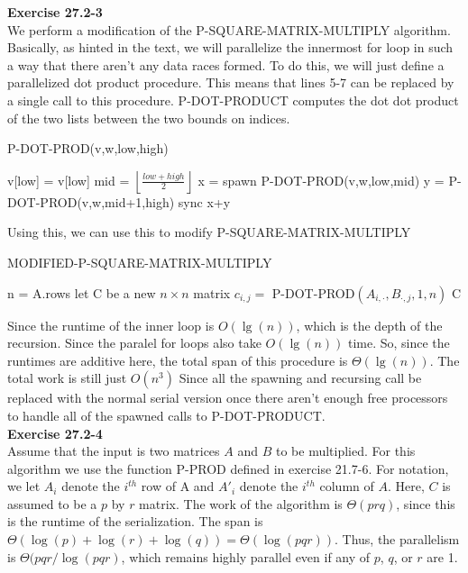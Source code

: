 \documentclass{article}
\begin{document}
\noindent\textbf{Exercise 27.2-3}\\

We perform a modification of the P-SQUARE-MATRIX-MULTIPLY algorithm. Basically, as hinted in the text, we will parallelize the innermost for loop in such a way that there aren't any data races formed. To do this, we will just define a parallelized dot product procedure. This means that lines 5-7 can be replaced by a single call to this procedure. P-DOT-PRODUCT computes the dot dot product of the two lists between the two bounds on indices.

\begin{algorithm}
\caption{P-DOT-PROD(v,w,low,high)}
\begin{algorithmic}
\State \Return  v[low] = v[low]
\EndIf
\State mid = $\left\lfloor \frac{low+high}{2}\right\rfloor$
\State x = spawn P-DOT-PROD(v,w,low,mid)
\State y = P-DOT-PROD(v,w,mid+1,high)
\State sync
\State \Return x+y
\end{algorithmic}
\end{algorithm}

Using this, we can use this to modify P-SQUARE-MATRIX-MULTIPLY

\begin{algorithm}
\caption{MODIFIED-P-SQUARE-MATRIX-MULTIPLY}
\begin{algorithmic}
\State n = A.rows
\State let C be a new $n\times n$ matrix
\State $c_{i,j} =$ P-DOT-PROD$(A_{i,\cdot},B_{\cdot,j},1,n)$
\EndParFor
\EndParFor
\State \Return C
\end{algorithmic}
\end{algorithm}

Since the runtime of the inner loop is $O(\lg(n))$, which is the depth of the recursion. Since the paralel for loops also take $O(\lg(n))$ time. So, since the runtimes are additive here, the total span of this procedure is $\Theta(\lg(n))$. The total work is still just $O(n^3)$ Since all the spawning and recursing call be replaced with the normal serial version once there aren't enough free processors to handle all of the spawned calls to P-DOT-PRODUCT. \\

\noindent\textbf{Exercise 27.2-4}\\

Assume that the input is two matrices $A$ and $B$ to be multiplied.  For this algorithm we use the function P-PROD defined in exercise 21.7-6.  For notation, we let $A_i$ denote the $i^{th}$ row of A and $A'_i$ denote the $i^{th}$ column of $A$.  Here, $C$ is assumed to be a $p$ by $r$ matrix. The work of the algorithm is $\Theta(prq)$, since this is the runtime of the serialization.  The span is $\Theta(\log(p) + \log(r) + \log(q)) = \Theta(\log(pqr))$.  Thus, the parallelism is $ \Theta(pqr / \log(pqr)$, which remains highly parallel even if any of $p$, $q$, or $r$ are 1.\\
\end{document}
